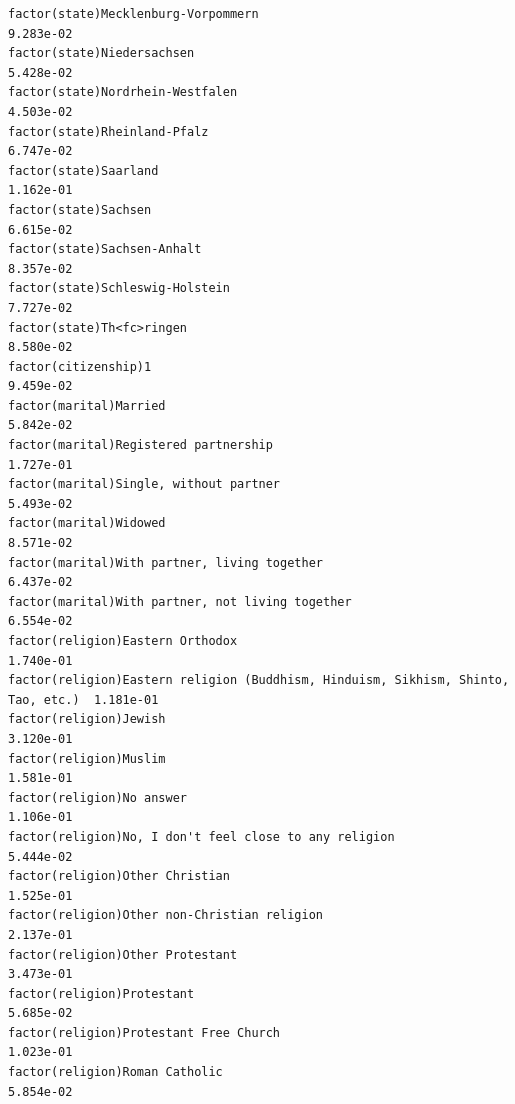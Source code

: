 \documentclass[
]{article}
\begin{document}
\begin{table}
\begin{minipage}[t]{\linewidth}
{\begin{verbatim}
factor(state)Mecklenburg-Vorpommern                                                9.283e-02
factor(state)Niedersachsen                                                         5.428e-02
factor(state)Nordrhein-Westfalen                                                   4.503e-02
factor(state)Rheinland-Pfalz                                                       6.747e-02
factor(state)Saarland                                                              1.162e-01
factor(state)Sachsen                                                               6.615e-02
factor(state)Sachsen-Anhalt                                                        8.357e-02
factor(state)Schleswig-Holstein                                                    7.727e-02
factor(state)Th<fc>ringen                                                          8.580e-02
factor(citizenship)1                                                               9.459e-02
factor(marital)Married                                                             5.842e-02
factor(marital)Registered partnership                                              1.727e-01
factor(marital)Single, without partner                                             5.493e-02
factor(marital)Widowed                                                             8.571e-02
factor(marital)With partner, living together                                       6.437e-02
factor(marital)With partner, not living together                                   6.554e-02
factor(religion)Eastern Orthodox                                                   1.740e-01
factor(religion)Eastern religion (Buddhism, Hinduism, Sikhism, Shinto, Tao, etc.)  1.181e-01
factor(religion)Jewish                                                             3.120e-01
factor(religion)Muslim                                                             1.581e-01
factor(religion)No answer                                                          1.106e-01
factor(religion)No, I don't feel close to any religion                             5.444e-02
factor(religion)Other Christian                                                    1.525e-01
factor(religion)Other non-Christian religion                                       2.137e-01
factor(religion)Other Protestant                                                   3.473e-01
factor(religion)Protestant                                                         5.685e-02
factor(religion)Protestant Free Church                                             1.023e-01
factor(religion)Roman Catholic                                                     5.854e-02

\end{verbatim}}
\end{minipage}
\end{table}
\end{document}
